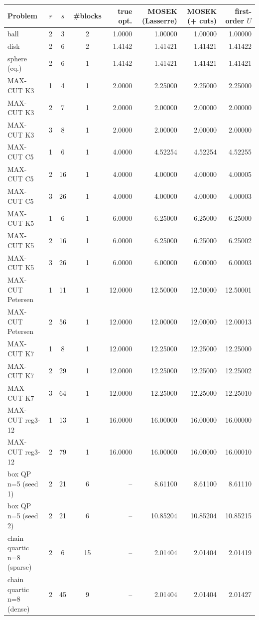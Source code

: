 \begin{tabular}{l c c c r r r r}\toprule
Problem & $r$ & $s$ & \#blocks & true opt. & MOSEK (Lasserre) & MOSEK (+ cuts) & first-order $U$ \\\midrule
ball & 2 & 3 & 2 & 1.0000 & 1.00000 & 1.00000 & 1.00000 \\
disk & 2 & 6 & 2 & 1.4142 & 1.41421 & 1.41421 & 1.41422 \\
sphere (eq.) & 2 & 6 & 1 & 1.4142 & 1.41421 & 1.41421 & 1.41421 \\
MAX-CUT K3 & 1 & 4 & 1 & 2.0000 & 2.25000 & 2.25000 & 2.25000 \\
MAX-CUT K3 & 2 & 7 & 1 & 2.0000 & 2.00000 & 2.00000 & 2.00000 \\
MAX-CUT K3 & 3 & 8 & 1 & 2.0000 & 2.00000 & 2.00000 & 2.00000 \\
MAX-CUT C5 & 1 & 6 & 1 & 4.0000 & 4.52254 & 4.52254 & 4.52255 \\
MAX-CUT C5 & 2 & 16 & 1 & 4.0000 & 4.00000 & 4.00000 & 4.00005 \\
MAX-CUT C5 & 3 & 26 & 1 & 4.0000 & 4.00000 & 4.00000 & 4.00003 \\
MAX-CUT K5 & 1 & 6 & 1 & 6.0000 & 6.25000 & 6.25000 & 6.25000 \\
MAX-CUT K5 & 2 & 16 & 1 & 6.0000 & 6.25000 & 6.25000 & 6.25002 \\
MAX-CUT K5 & 3 & 26 & 1 & 6.0000 & 6.00000 & 6.00000 & 6.00003 \\
MAX-CUT Petersen & 1 & 11 & 1 & 12.0000 & 12.50000 & 12.50000 & 12.50001 \\
MAX-CUT Petersen & 2 & 56 & 1 & 12.0000 & 12.00000 & 12.00000 & 12.00013 \\
MAX-CUT K7 & 1 & 8 & 1 & 12.0000 & 12.25000 & 12.25000 & 12.25000 \\
MAX-CUT K7 & 2 & 29 & 1 & 12.0000 & 12.25000 & 12.25000 & 12.25002 \\
MAX-CUT K7 & 3 & 64 & 1 & 12.0000 & 12.25000 & 12.25000 & 12.25010 \\
MAX-CUT reg3-12 & 1 & 13 & 1 & 16.0000 & 16.00000 & 16.00000 & 16.00000 \\
MAX-CUT reg3-12 & 2 & 79 & 1 & 16.0000 & 16.00000 & 16.00000 & 16.00010 \\
box QP n=5 (seed 1) & 2 & 21 & 6 & -- & 8.61100 & 8.61100 & 8.61110 \\
box QP n=5 (seed 2) & 2 & 21 & 6 & -- & 10.85204 & 10.85204 & 10.85215 \\
chain quartic n=8 (sparse) & 2 & 6 & 15 & -- & 2.01404 & 2.01404 & 2.01419 \\
chain quartic n=8 (dense) & 2 & 45 & 9 & -- & 2.01404 & 2.01404 & 2.01427 \\
\bottomrule\end{tabular}
